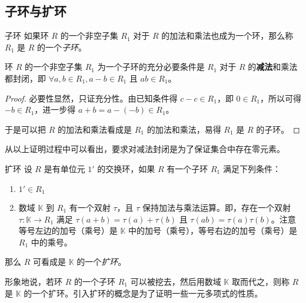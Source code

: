 \subsection{子环与扩环}

\begin{definition}{子环}
	如果环 $R$ 的一个非空子集 $R_1$ 对于 $R$ 的加法和乘法也成为一个环，那么称 $R_1$ 是 $R$ 的一个\emph{子环}。
\end{definition}

\begin{proposition}
	环 $R$ 的一个非空子集 $R_1$ 为一个子环的充分必要条件是 $R_1$ 对于 $R$ 的\textbf{减法}和乘法都封闭，即 $\forall a, b \in R_1, a - b \in R_1$ 且 $ab \in R_1$。
\end{proposition}

\begin{proof}
	必要性显然，只证充分性。由已知条件得 $c - c \in R_1$，即 $0 \in R_1$，所以可得 $-b \in R_1$，进一步得 $a + b = a - (-b) \in R_1$。

	于是可以把 $R$ 的加法和乘法看成是 $R_1$ 的加法和乘法，易得 $R_1$ 是 $R$ 的子环。
\end{proof}

从以上证明过程中可以看出，要求对减法封闭是为了保证集合中存在零元素。

\begin{definition}{扩环}
	设 $R$ 是有单位元 $1'$ 的交换环，如果 $R$ 有一个子环 $R_1$ 满足下列条件：

	\begin{enumerate}
		\item $1' \in R_1$
		\item 数域 $\mathbb K$ 到 $R_1$ 有一个双射 $\tau$，且 $\tau$ 保持加法与乘法运算。即，存在一个双射 $\tau \colon \mathbb K \to R_1$ 满足 $\tau(a + b) = \tau(a) + \tau(b)$ 且 $\tau(ab) = \tau(a) \tau(b)$。注意等号左边的加号（乘号）是 $\mathbb K$ 中的加号（乘号），等号右边的加号（乘号）是 $R_1$ 中的乘号。
	\end{enumerate}

	那么 $R$ 可看成是 $\mathbb K$ 的一个\emph{扩环}。
\end{definition}

形象地说，若环 $R$ 的一个子环 $R_1$ 可以被挖去，然后用数域 $\mathbb K$ 取而代之，则称 $R$ 是 $\mathbb K$ 的一个扩环。引入扩环的概念是为了证明一些一元多项式的性质。

